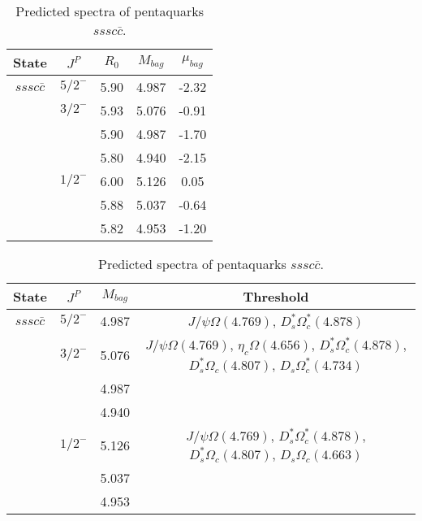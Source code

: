 \documentclass[prd,twocolumn,floatfix,nofootinbib]{revtex4}
\begin{document}
\renewcommand{\tabcolsep}{0.5cm}
\renewcommand{\arraystretch}{1.2}
\begin{table*}[!htbp]
    \caption{Predicted spectra of pentaquarks $sssc\bar{c}$.}
    \begin{tabular}{ccccc}
        \hline\hline
        {\rm State} &$J^{P}$ &$R_{0}$ &$M_{bag}$ &$\mu_{bag}$ \\ \hline
        $sssc\bar{c}$
            &${5/2}^{-}$    &5.90   &4.987 &-2.32 \\
            &${3/2}^{-}$    &5.93   &5.076 &-0.91  \\
            &               &5.90   &4.987 &-1.70  \\
            &               &5.80   &4.940 &-2.15  \\
            &${1/2}^{-}$    &6.00   &5.126 &0.05  \\
            &               &5.88   &5.037 &-0.64  \\
            &               &5.82   &4.953 &-1.20  \\
        \hline\hline
    \end{tabular}
\end{table*}

\renewcommand{\tabcolsep}{0.5cm}
\renewcommand{\arraystretch}{1.2}
\begin{table*}[!htbp]
    \caption{Predicted spectra of pentaquarks $sssc\bar{c}$.}
    \begin{tabular}{cccc}
        \hline\hline
        {\rm State} &$J^{P}$ &$M_{bag}$ &Threshold \\ \hline
        $sssc\bar{c}$
            &${5/2}^{-}$    &4.987 &$J/\psi\Omega(4.769)$, $D_{s}^{\ast}\Omega_{c}^{\ast}(4.878)$ \\
            &${3/2}^{-}$    &5.076 &$J/\psi\Omega(4.769)$, $\eta_{c}\Omega(4.656)$, $D_{s}^{\ast}\Omega_{c}^{\ast}(4.878)$, $D_{s}^{\ast}\Omega_{c}(4.807)$, $D_{s}\Omega_{c}^{\ast}(4.734)$ \\
            &               &4.987 & \\
            &               &4.940 & \\
            &${1/2}^{-}$    &5.126 &$J/\psi\Omega(4.769)$, $D_{s}^{\ast}\Omega_{c}^{\ast}(4.878)$, $D_{s}^{\ast}\Omega_{c}(4.807)$, $D_{s}\Omega_{c}(4.663)$ \\
            &               &5.037 & \\
            &               &4.953 & \\
        \hline\hline
    \end{tabular}
\end{table*}
\end{document}
